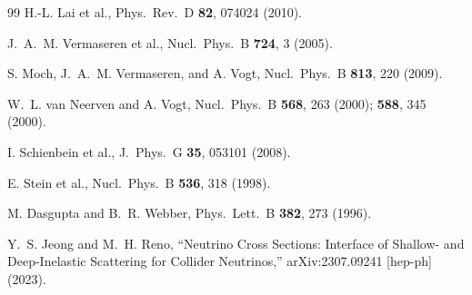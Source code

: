\documentclass[10pt,twocolumn]{article}
\begin{document}
\begin{thebibliography}{99}
  H.-L. Lai et al.,
  Phys.\ Rev.\ D \textbf{82}, 074024 (2010).

  J.~A.~M. Vermaseren et al.,
  Nucl.\ Phys.\ B \textbf{724}, 3 (2005).

  S. Moch, J.~A.~M. Vermaseren, and A. Vogt,
  Nucl.\ Phys.\ B \textbf{813}, 220 (2009).

  W.~L. van Neerven and A. Vogt,
  Nucl.\ Phys.\ B \textbf{568}, 263 (2000); \textbf{588}, 345 (2000).

  I. Schienbein et al.,
  J.\ Phys.\ G \textbf{35}, 053101 (2008).

  E. Stein et al.,
  Nucl.\ Phys.\ B \textbf{536}, 318 (1998).

  M. Dasgupta and B.~R. Webber,
  Phys.\ Lett.\ B \textbf{382}, 273 (1996).

  Y.~S. Jeong and M.~H. Reno,
  ``Neutrino Cross Sections: Interface of Shallow- and Deep-Inelastic
  Scattering for Collider Neutrinos,'' arXiv:2307.09241 [hep-ph] (2023).

\end{thebibliography}
\end{document}
